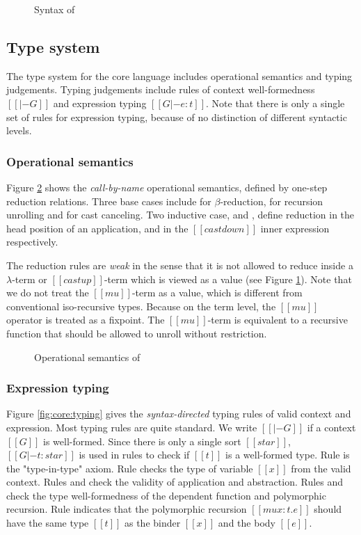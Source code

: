 \begin{figure}
    \gram{\otte\ottinterrule
        \ottG\ottinterrule
        \ottv}
    \caption{Syntax of \name}
    \label{fig:core:syntax}
\end{figure}

\subsection{Type system}\label{sec:core:type}
The type system for the core language includes operational semantics and typing judgements. Typing judgements include rules of context well-formedness $[[|- G]]$ and expression typing $[[G |- e : t]]$. Note that there is only a single set of rules for expression typing, because of no distinction of different syntactic levels.

\subsubsection{Operational semantics}
Figure \ref{fig:core:opsem} shows the \emph{call-by-name} operational semantics, defined by one-step reduction relations. Three base cases include  for $\beta$-reduction,  for recursion unrolling and  for cast canceling. Two inductive case,  and , define reduction in the head position of an application, and in the $[[castdown]]$ inner expression respectively.

The reduction rules are \emph{weak} in the sense that it is not allowed to reduce inside a $\lambda$-term or $[[castup]]$-term which is viewed as a value (see Figure \ref{fig:core:syntax}). Note that we do not treat the $[[mu]]$-term as a value, which is different from conventional iso-recursive types. Because on the term level, the $[[mu]]$ operator is treated as a fixpoint. The $[[mu]]$-term is equivalent to a recursive function that should be allowed to unroll without restriction.

\begin{figure}
    \ottdefnstep{}
    \caption{Operational semantics of \name}
    \label{fig:core:opsem}
\end{figure}

\subsubsection{Expression typing}
Figure \ref{fig:core:typing} gives the \emph{syntax-directed} typing rules of valid context and expression. Most typing rules are quite standard. We write $[[|- G]]$ if a context $[[G]]$ is well-formed. Since there is only a single sort $[[star]]$, $[[G |- t : star]]$ is used in rules to check if $[[t]]$ is a well-formed type. Rule  is the "type-in-type" axiom. Rule  checks the type of variable $[[x]]$ from the valid context. Rules  and  check the validity of application and abstraction. Rules  and  check the type well-formedness of the dependent function and polymorphic recursion. Rule  indicates that the polymorphic recursion $[[mu x:t.e]]$ should have the same type $[[t]]$ as the binder $[[x]]$ and the body $[[e]]$.

